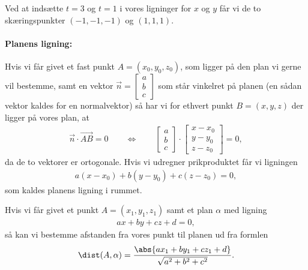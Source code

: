 Ved at indsætte $t=3$ og $t=1$ i vores ligninger for $x$ og $y$ får vi de to skæringspunkter  $(-1,-1,-1)$ og $(1,1,1)$.


\paragraph*{Planens ligning:}
Hvis vi får givet et fast punkt $A=(x_0,y_0,z_0)$, som ligger på den plan vi gerne vil bestemme, samt en vektor $\vec{n}=\begin{bmatrix}a \\ b \\ c \end{bmatrix}$ som står vinkelret på planen (en sådan vektor kaldes for en normalvektor) så har vi for ethvert punkt $B=(x,y,z)$ der ligger på vores plan, at
\begin{align*}
\vec{n} \cdot \overrightarrow{AB} = 0 \qquad \Leftrightarrow \qquad \begin{bmatrix}a \\ b \\ c\end{bmatrix} \cdot \begin{bmatrix} x - x_0 \\ y - y_0 \\ z - z_0 \end{bmatrix} =0,
\end{align*}
da de to vektorer er ortogonale. Hvis vi udregner prikproduktet får vi ligningen
\begin{align}\label{eq:vec3d2to}
a(x-x_0) + b(y-y_0) + c(z-z_0) = 0,
\end{align}
som kaldes planens ligning i rummet.

Hvis vi får givet et punkt $A=(x_1,y_1,z_1)$ samt et plan $\alpha$ med ligning
\begin{align*}
ax+by+cz+d=0,
\end{align*}
så kan vi bestemme afstanden fra vores punkt til planen ud fra formlen
\begin{align}\label{eq:vec3d2afstandpunkttilplan}
\dist(A,\alpha)= \frac{\abs{ax_1+by_1+cz_1 + d}}{\sqrt{a^2+b^2+c^2}}.
\end{align}

